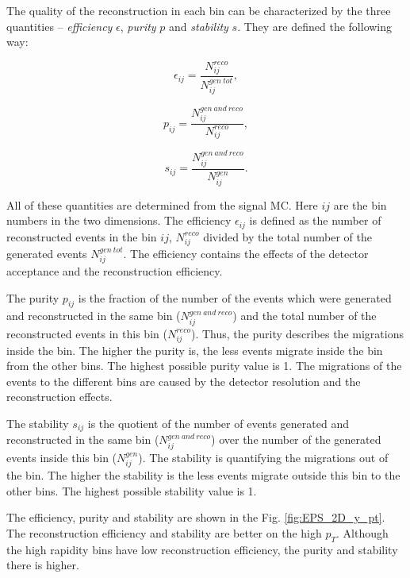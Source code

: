 The quality of the reconstruction in each bin can be characterized by the three quantities -- \textit{efficiency} $\epsilon$, \textit{purity} $p$ and
\textit{stability} $s$. They are defined the following way:

\begin{equation}
 \epsilon_{ij} = \frac{N_{ij}^{reco}}{N_{ij}^{gen\:tot}},
\end{equation}

\begin{equation}
 p_{ij} = \frac{N_{ij}^{gen\:and\:reco}}{N_{ij}^{reco}},
\end{equation}

\begin{equation}
 s_{ij} = \frac{N_{ij}^{gen\:and\:reco}}{N_{ij}^{gen}}.
\end{equation}

All of these quantities are determined from the signal MC. Here $ij$ are the bin numbers in the two dimensions. The efficiency 
$\epsilon_{ij}$ is defined as the number of reconstructed events in the bin $ij$, $N_{ij}^{reco}$ divided by the total number of 
the generated events $N_{ij}^{gen\:tot}$. The efficiency contains the effects of the detector acceptance and the reconstruction efficiency.

The purity $p_{ij}$ is the fraction of the number of the events which were generated and reconstructed in the same bin ($N_{ij}^{gen\:and\:reco}$)
and the total number of the reconstructed events in this bin ($N_{ij}^{reco}$). Thus, the purity describes the migrations inside the bin.
The higher the purity is, the less events migrate inside the bin from the other bins. The highest possible purity value is 1.
The migrations of the events to the different bins are caused by the detector resolution and the reconstruction effects.

The stability $s_{ij}$ is the quotient of the number of events generated and reconstructed in the same bin ($N_{ij}^{gen\:and\:reco}$) over the 
number of the generated events inside this bin ($N_{ij}^{gen}$). The stability is quantifying the migrations out of the bin. The higher 
the stability is the less events migrate outside this bin to the other bins. The highest possible stability value is 1.

The efficiency, purity and stability are shown in the Fig. \ref{fig:EPS_2D_y_pt}. The reconstruction efficiency and stability are better on the
high $p_{T}$. Although the high rapidity bins have low reconstruction efficiency, the purity and stability there is higher.

